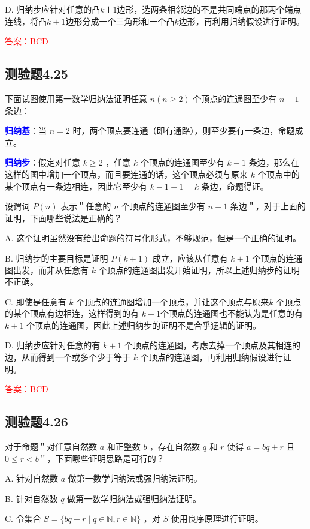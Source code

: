 \documentclass[UTF8, heading=true]{ctexart}
\begin{document}
D. 
归纳步应针对任意的凸$k＋1$边形，选两条相邻边的不是共同端点的那两个端点连线，将凸$k+1$边形分成一个三角形和一个凸$k$边形，再利用归纳假设进行证明。

\textcolor{red}{答案：BCD}

\subsection{测验题4.25}

下面试图使用第一数学归纳法证明任意 $n(n \geq 2)$ 个顶点的连通图至少有 $n-1$ 条边：

\textcolor{blue}{\textbf{归纳基}}：当 $n=2$ 时，两个顶点要连通（即有通路），则至少要有一条边，命题成立。

\textcolor{blue}{\textbf{归纳步}}：假定对任意 $k \geq 2$ ，任意 $k$ 个顶点的连通图至少有 $k-1$ 条边，那么在这样的图中增加一个顶点，而且要连通的话，这个顶点必须与原来 $k$ 个顶点中的某个顶点有一条边相连，因此它至少有 $k-1+1=k$ 条边，命题得证。

设谓词 $P(n)$ 表示＂任意的 $n$ 个顶点的连通图至少有 $n-1$ 条边＂，对于上面的证明，下面哪些说法是正确的？

A. 这个证明虽然没有给出命题的符号化形式，不够规范，但是一个正确的证明。

B. 
归纳步的主要目标是证明 $P(k+1)$ 成立，应该从任意有 $k+1$ 个顶点的连通图出发，而非从任意有 $k$ 个顶点的连通图出发开始证明，所以上述归纳步的证明不正确。

C. 
即使是任意有 $k$ 个顶点的连通图增加一个顶点，并让这个顶点与原来$k$ 个顶点的某个顶点有边相连，这样得到的有 $k+1$个顶点的连通图也不能认为是任意的有 $k+1$ 个顶点的连通图，因此上述归纳步的证明不是合乎逻辑的证明。

D. 
归纳步应针对任意的有 $k+1$ 个顶点的连通图，考虑去掉一个顶点及其相连的边，从而得到一个或多个少于等于 $k$ 个顶点的连通图，再利用归纳假设进行证明。


\textcolor{red}{答案：BCD}

\subsection{测验题4.26}

对于命题＂对任意自然数 $a$ 和正整数 $b$ ，存在自然数 $q$ 和 $r$ 使得 $a=b q+r$ 且 $0 \leq r<b$＂，下面哪些证明思路是可行的？

A. 针对自然数 $a$ 做第一数学归纳法或强归纳法证明。

B. 针对自然数 $q$ 做第一数学归纳法或强归纳法证明。

C. 令集合 $S=\{b q+r \mid q \in \mathbb{N}, r \in \mathbb{N}\}$ ，对 $S$ 使用良序原理进行证明。
\end{document}
